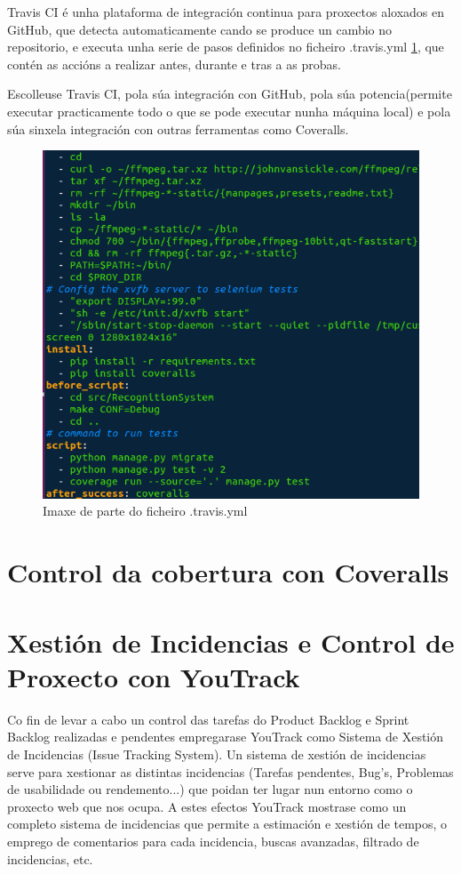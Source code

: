     Travis CI é unha plataforma de integración continua para proxectos aloxados en GitHub, que 
    detecta automaticamente cando se produce un cambio no repositorio, e executa unha serie de pasos 
    definidos no ficheiro .travis.yml \ref{fig:travisYml}, que contén as accións a realizar 
    antes, durante e tras a as probas.
    
    Escolleuse Travis CI, pola súa integración con GitHub, pola súa potencia(permite executar 
    practicamente todo o que se pode executar nunha máquina local) e pola súa sinxela integración
    con outras ferramentas como Coveralls.
    
    \begin{figure}[!htp]
    \begin{center}
        \includegraphics[scale=0.6]{figures/travisYml.png}
        \caption{Imaxe de parte do ficheiro .travis.yml}
    \label{fig:travisYml}
    \end{center}
    \end{figure}
    
    
\section{Control da cobertura con Coveralls}

\section{Xestión de Incidencias e Control de Proxecto con YouTrack}
    Co fin de levar a cabo un control das tarefas do Product Backlog e Sprint Backlog realizadas e 
    pendentes empregarase YouTrack como Sistema de Xestión de Incidencias (Issue Tracking System). 
    Un sistema de xestión de incidencias serve para xestionar as distintas incidencias (Tarefas 
    pendentes, Bug's, Problemas de usabilidade ou rendemento...) que poidan ter lugar nun entorno 
    como o proxecto web que nos ocupa. A estes efectos YouTrack mostrase como un completo sistema 
    de incidencias que permite a estimación e xestión de tempos, o emprego de comentarios para cada
    incidencia, buscas avanzadas, filtrado de incidencias, etc.
    

